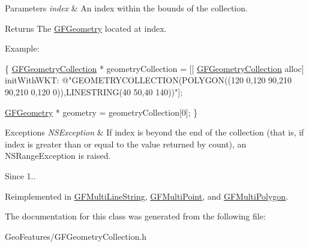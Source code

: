 \begin{DoxyParams}{Parameters}
{\em index} & An index within the bounds of the collection.\\
\hline
\end{DoxyParams}
\begin{DoxyReturn}{Returns}
The \hyperlink{interface_g_f_geometry}{G\+F\+Geometry} located at index.
\end{DoxyReturn}
Example\+:


\begin{DoxyCode}
\{
   \hyperlink{interface_g_f_geometry_collection}{GFGeometryCollection} * geometryCollection = [[
      \hyperlink{interface_g_f_geometry_collection}{GFGeometryCollection} alloc] initWithWKT: \textcolor{stringliteral}{@"GEOMETRYCOLLECTION(POLYGON((120 0,120 90,210
       90,210 0,120 0)),LINESTRING(40 50,40 140))"}];

   \hyperlink{interface_g_f_geometry}{GFGeometry} * geometry = geometryCollection[0];
\}
\end{DoxyCode}



\begin{DoxyExceptions}{Exceptions}
{\em N\+S\+Exception} & If index is beyond the end of the collection (that is, if index is greater than or equal to the value returned by count), an N\+S\+Range\+Exception is raised.\\
\hline
\end{DoxyExceptions}
\begin{DoxySince}{Since}
1.. 
\end{DoxySince}


Reimplemented in \hyperlink{interface_g_f_multi_line_string_a00496d2af8be614fe4cc11c6a6347591}{G\+F\+Multi\+Line\+String}, \hyperlink{interface_g_f_multi_point_a003241a11b6d6da14364bb8a07c05a35}{G\+F\+Multi\+Point}, and \hyperlink{interface_g_f_multi_polygon_ac0de2e4160cbb5e83522fc72502f681c}{G\+F\+Multi\+Polygon}.



The documentation for this class was generated from the following file\+:\begin{DoxyCompactItemize}
\item 
Geo\+Features/G\+F\+Geometry\+Collection.\+h\end{DoxyCompactItemize}
